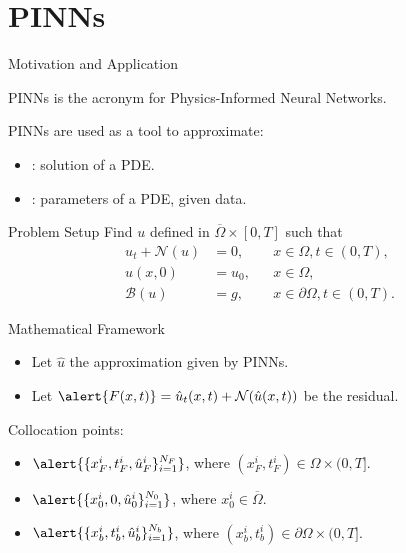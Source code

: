 \section{PINNs}
    
    \begin{frame}{Motivation and Application}
        \begin{block}{}
            \alert{PINNs} is the acronym for Physics-Informed Neural Networks.
        \end{block}
        \vspace{0.4cm}
        
        PINNs are used as a tool to approximate:
        \begin{itemize}
            \item {}: solution of a PDE.
            \item {}: parameters of a PDE, given data.
        \end{itemize}
        \vspace{0.4cm}
        
        \begin{block}{Problem Setup}
            Find $u$ defined in $\overline{\Omega}\times[0,T]$ such that
            \begin{align*}
                u_t+\mathcal{N}(u)&=0, &&x\in\Omega, t\in (0,T),\\
                u(x,0)&=u_0,  &&x\in\Omega,\\
                \mathcal{B}(u)&=g, &&x\in\partial\Omega, t\in(0,T).
            \end{align*}
        \end{block}
    \end{frame}
    
    \begin{frame}{Mathematical Framework}
        \begin{block}{}
            \begin{itemize}
                \item Let \alert{$\hat u$} the approximation given by PINNs.
                \item Let $\alert{F(x, t)}=\hat u_t(x,t)+\mathcal{N}(\hat u(x,t))$ be the residual.
            \end{itemize}
        \end{block}
        
        \vspace*{0.5cm}
        Collocation points:
        \begin{itemize}
            \item $\alert{\{x^i_F, t ^i_F, \hat u^i_F\}_{i=1}^{N_F}}$, where $(x^i_F, t ^i_F)\in\Omega\times(0,T]$.
            \item $\alert{\{x^i_0, 0, \hat u^i_0\}_{i=1}^{N_0}}$, where $x^i_0\in\overline\Omega$.
            \item $\alert{\{x^i_b, t ^i_b, \hat u^i_b\}_{i=1}^{N_b}}$, where $(x^i_b, t ^i_b)\in\partial\Omega\times(0,T]$.
        \end{itemize}
    \end{frame}
    
